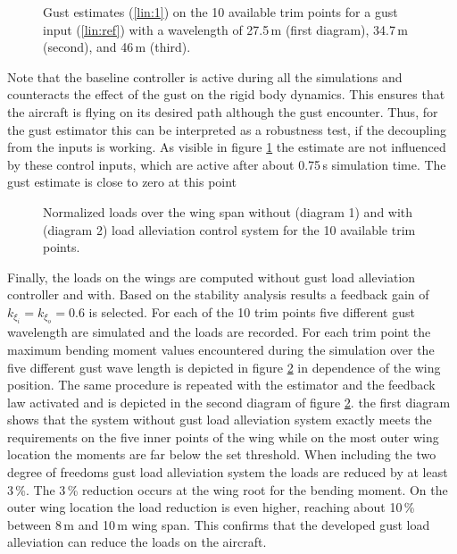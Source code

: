 \documentclass[graybox]{svmult}
\begin{document}
\begin{figure}[bth]
	\sidecaption[]
	
	\caption{Gust estimates (\ref{lin:1}) on the 10 available trim points for a gust input (\ref{lin:ref}) with a wavelength of 27.5\,m (first diagram), 34.7\,m (second), and 46\,m (third). }
	\label{fig:est}
\end{figure}



Note that the baseline controller is active during all the simulations and counteracts the effect of the gust on the rigid body dynamics. This ensures that the aircraft is flying on its desired path although the gust encounter. Thus, for the gust estimator this can be interpreted as a robustness test, if the decoupling from the inputs is working. As visible in figure \ref{fig:est} the estimate are not influenced by these control inputs, which are active after about 0.75\,s simulation time. The gust estimate is close to zero at this point

\begin{figure}[bth]
	\sidecaption[]
	
	\caption{Normalized loads over the wing span without (diagram 1) and with (diagram 2) load alleviation control system  for the 10 available trim points.}
	\label{fig:loads}	
\end{figure}

Finally, the loads on the wings are computed without gust load alleviation controller and with.  Based on the stability analysis results a feedback gain of $k_{\xi_i}=k_{\xi_o}=0.6$ is selected. For each of the 10 trim points five different gust wavelength are simulated and the loads are recorded. For each trim point the maximum bending moment values  encountered during the simulation over the five different gust wave length is depicted in figure \ref{fig:loads} in dependence of the wing position. The same procedure is repeated with the estimator and the feedback law activated and is depicted in the second diagram of figure \ref{fig:loads}. the first diagram shows that the system without gust load alleviation system exactly meets the requirements on the five inner  points of the wing while on the most outer wing location the moments are far below the set threshold. When including the two degree of freedoms gust load alleviation system the loads are reduced by at least 3\,\%. The 3\,\% reduction occurs at the wing root for the bending moment. On the outer wing location the load reduction is even higher, reaching about 10\,\% between 8\,m and 10\,m wing span.
This confirms that the developed gust load alleviation can reduce the loads on the aircraft.
\end{document}
